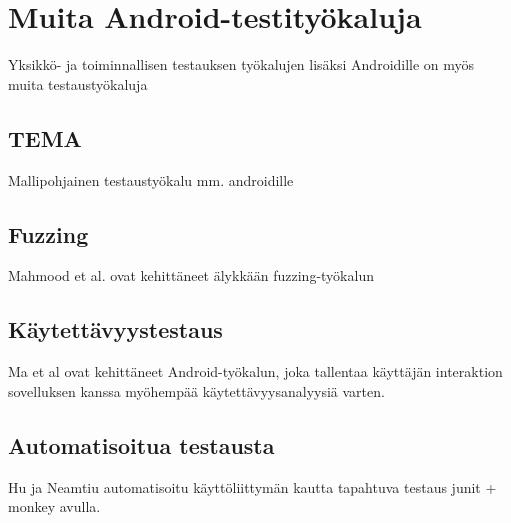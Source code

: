 \section{Muita Android-testityökaluja}

Yksikkö- ja toiminnallisen testauksen työkalujen lisäksi Androidille on myös muita testaustyökaluja

\subsection{TEMA}

Mallipohjainen testaustyökalu mm. androidille \cite{takalaetal11}

\subsection{Fuzzing}



Mahmood et al. ovat kehittäneet älykkään fuzzing-työkalun

\subsection{Käytettävyystestaus}

Ma et al \cite{maetal11} ovat kehittäneet Android-työkalun, joka tallentaa käyttäjän interaktion sovelluksen kanssa myöhempää käytettävyysanalyysiä varten.

\subsection{Automatisoitua testausta}

Hu ja Neamtiu \cite{hu10} automatisoitu käyttöliittymän kautta tapahtuva testaus junit + monkey avulla.